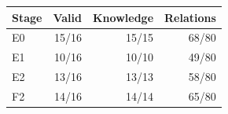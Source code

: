 \begin{tabular}{lrrr}
\toprule
Stage & Valid & Knowledge & Relations \\
\midrule
E0 & 15/16 & 15/15 & 68/80 \\
E1 & 10/16 & 10/10 & 49/80 \\
E2 & 13/16 & 13/13 & 58/80 \\
F2 & 14/16 & 14/14 & 65/80 \\
\bottomrule
\end{tabular}
